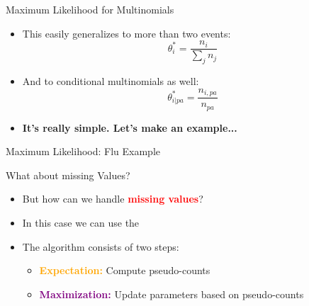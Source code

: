 \begin{frame}{Maximum Likelihood for Multinomials}{}
	\begin{itemize}
		\item This easily generalizes to more than two events:
		\begin{equation*}
			\theta_i^* = \frac{n_i}{\sum_j n_j}
		\end{equation*}
		\item And to conditional multinomials as well:
		\begin{equation*}
			\theta_{i \vert pa}^* = \frac{n_{i, pa}}{n_{pa}}
		\end{equation*}
		\item \textbf{It's really simple. Let's make an example...}
	\end{itemize}
\end{frame}


\begin{frame}{Maximum Likelihood: Flu Example}{}
\end{frame}


\begin{frame}{What about missing Values?}{}
	\begin{itemize}
		\item But how can we handle \textcolor{red}{\textbf{missing values}}?
		\item In this case we can use the 
		
		\item The algorithm consists of two steps:
		\begin{itemize}
			\item \textcolor{orange}{\textbf{Expectation:}} Compute pseudo-counts
			\item \textcolor{purple}{\textbf{Maximization:}} Update parameters based on pseudo-counts
		\end{itemize}
	\end{itemize}
\end{frame}


